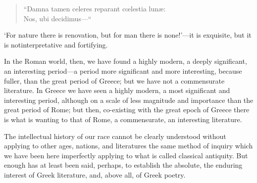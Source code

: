 \begin{verse} 

``Damna tamen celeres reparant cœlestia lunæ:\\Nos, ubi decidimus---``


\end{verse} 

`For nature there is renovation, but for man there is none!'---it is
exquisite, but it is notinterpretative and fortifying.

In the Roman world, then, we have found a highly modern, a deeply
significant, an interesting period---a period more significant and more
interesting, because fuller, than the great period of Greece; but we
have not a commensurate literature. In Greece we have seen a highly
modern, a most significant and interesting period, although on a scale
of less magnitude and importance than the great period of Rome; but
then, co-existing with the great epoch of Greece there is what is
wanting to that of Rome, a commensurate, an interesting literature.

The intellectual history of our race cannot be clearly understood
without applying to other ages, nations, and literatures the same method
of inquiry which we have been here imperfectly applying to what is
called classical antiquity. But enough has at least been said, perhaps,
to establish the absolute, the enduring interest of Greek literature,
and, above all, of Greek poetry.

